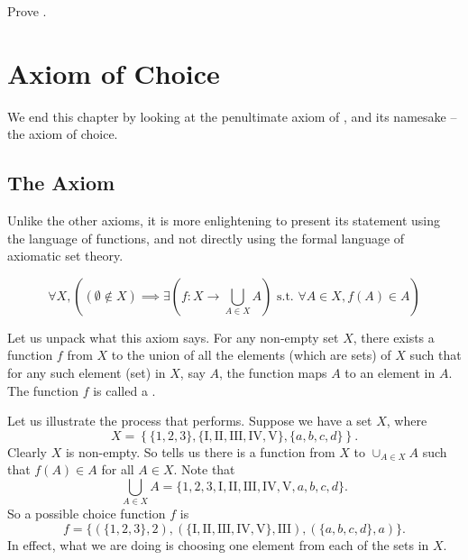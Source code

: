 \begin{exercise}\label{exercise:composition-of-surjective-functions-is-surjective}
    Prove .
\end{exercise}

\section{Axiom of Choice}
We end this chapter by looking at the penultimate axiom of \ZFC, and its namesake -- the axiom of choice.

\subsection{The Axiom}
Unlike the other axioms, it is more enlightening to present its statement using the language of functions, and not directly using the formal language of axiomatic set theory.

\begin{axiom}[Choice]\label{axiom:choice}
    \vspace{-10px}
    \[
        \forall X, \left((\emptyset \notin X) \implies \exists \left(f: X \to \bigcup_{A \in X} A\right) \text{ s.t. } \forall A \in X, f(A) \in A\right)
    \]
\end{axiom}

Let us unpack what this axiom says. For any non-empty set $X$, there exists a function $f$ from $X$ to the union of all the elements (which are sets) of $X$ such that for any such element (set) in $X$, say $A$, the function maps $A$ to an element in $A$. The function $f$ is called a .

Let us illustrate the process that  performs. Suppose we have a set $X$, where
\[
    X = \left\{\{1, 2, 3\}, \{\text{I}, \text{II}, \text{III}, \text{IV}, \text{V}\}, \{a, b, c, d\}\right\}.
\]
Clearly $X$ is non-empty. So  tells us there is a function from $X$ to $\cup_{A\in X} A$ such that $f(A) \in A$ for all $A \in X$. Note that
\[
    \bigcup_{A \in X} A = \{1, 2, 3, \text{I}, \text{II}, \text{III}, \text{IV}, \text{V}, a, b, c, d\}.
\]
So a possible choice function $f$ is
\[
    f = \{(\{1, 2, 3\}, 2), (\{\text{I}, \text{II}, \text{III}, \text{IV}, \text{V}\}, \text{III}), (\{a,b,c,d\}, a)\}.
\]
In effect, what we are doing is choosing one element from each of the sets in $X$.

